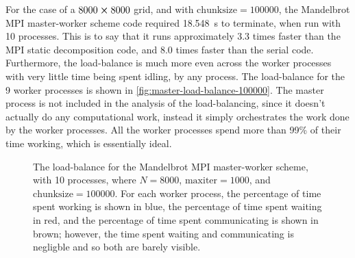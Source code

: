 \documentclass{article}
\begin{document}
For the case of a $8000 \cross 8000$ grid, and with
$\mathrm{chunksize} = 100000$, the Mandelbrot MPI master-worker scheme code
required \SI{18.548}{\second} to terminate, when run with 10 processes.
This is to say that it runs approximately 3.3 times faster than the MPI static
decomposition code, and 8.0 times faster than the serial code.
Furthermore, the load-balance is much more even across the worker processes with
very little time being spent idling, by any process.
The load-balance for the 9 worker processes is shown in
\autoref{fig:master-load-balance-100000}.
The master process is not included in the analysis of the load-balancing, since
it doesn't actually do any computational work, instead it simply orchestrates
the work done by the worker processes.
All the worker processes spend more than 99\% of their time working, which is
essentially ideal.
\begin{figure}[h]
  \centering
  \caption{The load-balance for the Mandelbrot MPI master-worker scheme,
    with 10 processes, where $N = 8000$, $\mathrm{maxiter} = 1000$, and
    $\mathrm{chunksize} = 100000$. For each worker process, the percentage of
    time spent working is shown in blue, the percentage of time spent waiting in
    red, and the percentage of time spent communicating is shown in brown;
    however, the time spent waiting and communicating is negligble and so both
    are barely visible.}
  \label{fig:master-load-balance-100000}
\end{figure}
\end{document}
